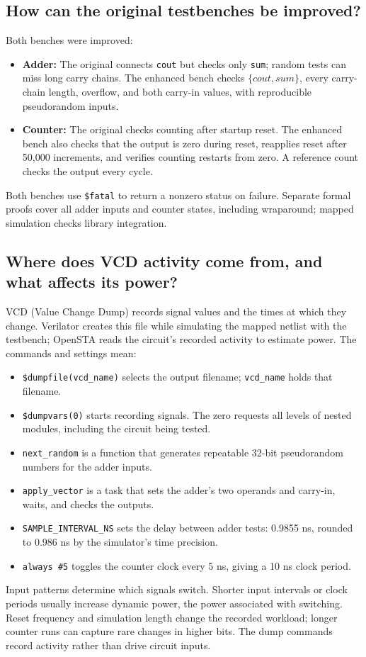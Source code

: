 \documentclass[10pt,letterpaper]{article}
\begin{document}
\subsection{How can the original testbenches be improved?}
Both benches were improved:
\begin{itemize}
\item \textbf{Adder:} The original connects \texttt{cout} but checks only
\texttt{sum}; random tests can miss long carry chains. The enhanced bench
checks $\{cout,sum\}$, every carry-chain length, overflow, and both carry-in
values, with reproducible pseudorandom inputs.
\item \textbf{Counter:} The original checks counting after startup reset.
The enhanced bench also checks that the output is zero during reset,
reapplies reset after 50,000 increments, and verifies counting restarts
from zero. A reference count checks the output every cycle.
\end{itemize}
Both benches use \texttt{\$fatal} to return a nonzero status on failure.
Separate formal proofs cover all adder inputs and counter states, including
wraparound; mapped simulation checks library integration.

\subsection{Where does VCD activity come from, and what affects its power?}
VCD (Value Change Dump) records signal values and the times at which they
change. Verilator creates this file while simulating the mapped netlist
with the testbench; OpenSTA reads the circuit's recorded activity to
estimate power. The commands and settings mean:
\begin{itemize}
\item \texttt{\$dumpfile(vcd\_name)} selects the output filename;
\texttt{vcd\_name} holds that filename.
\item \texttt{\$dumpvars(0)} starts recording signals. The zero requests
all levels of nested modules, including the circuit being tested.
\item \texttt{next\_random} is a function that generates repeatable
32-bit pseudorandom numbers for the adder inputs.
\item \texttt{apply\_vector} is a task that sets the adder's two operands
and carry-in, waits, and checks the outputs.
\item \texttt{SAMPLE\_INTERVAL\_NS} sets the delay between adder tests:
0.9855 ns, rounded to 0.986 ns by the simulator's time precision.
\item \texttt{always \#5} toggles the counter clock every 5 ns, giving
a 10 ns clock period.
\end{itemize}
Input patterns determine which signals switch. Shorter input intervals or
clock periods usually increase dynamic power, the power associated with
switching. Reset frequency and simulation length change the recorded
workload; longer counter runs can capture rare changes in higher bits.
The dump commands record activity rather than drive circuit inputs.
\end{document}
